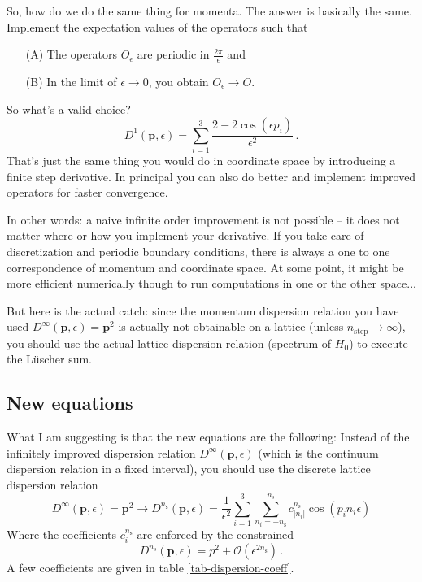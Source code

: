 \documentclass[
    aps,
    prl,
    showkeys,
    nofootinbib,
    floatfix
]{revtex4-1}
\renewcommand{\vec}[1]{\boldsymbol{#1}}
\begin{document}
So, how do we do the same thing for momenta.
The answer is basically the same.
Implement the expectation values of the operators such that
\begin{itemize}
    \item[(A)] The operators $O_\epsilon$ are periodic in $\frac{2\pi}{\epsilon}$ and
    \item[(B)] In the limit of $\epsilon \to 0$, you obtain  $O_\epsilon \to  O$.
\end{itemize}

So what's a valid choice?
\begin{equation}
	D^1( \vec p, \epsilon) = \sum_{i=1}^3 \frac{2 - 2 \cos(\epsilon p_i)}{\epsilon^2} \, .
\end{equation}
That's just the same thing you would do in coordinate space by introducing a finite step derivative.
In principal you can also do better and implement improved operators for faster convergence.

In other words: a naive infinite order improvement is not possible -- it does not matter where or how you implement your derivative.
If you take care of discretization and periodic boundary conditions, there is always a one to one correspondence of momentum and coordinate space.
At some point, it might be more efficient numerically though to run computations in one or the other space...

But here is the actual catch: since the momentum dispersion relation you have used $D^\infty(\vec p, \epsilon) = \vec p^2$ is actually not obtainable on a lattice (unless $n_{\mathrm{step}} \to \infty$), you should use the actual lattice dispersion relation (spectrum of $H_0$) to execute the Lüscher sum.

\subsection{New equations}

What I am suggesting is that the new equations are the following:
Instead of the infinitely improved dispersion relation $D^\infty(\vec p, \epsilon)$ (which is the continuum dispersion relation in a fixed interval), you should use the discrete lattice dispersion relation
\begin{equation}
    D^\infty(\vec p, \epsilon) = \vec p ^2 
    \to 
    D^{n_{\mathrm{s}}}(\vec p, \epsilon) 
    =
    \frac{1}{\epsilon^2} \sum\limits_{i=1}^3 \sum\limits_{n_i=-n_{\mathrm{s}}}^{n_{\mathrm{s}}} c_{|n_i|}^{n_{\mathrm{s}}} \cos( p_i n_i \epsilon)
\end{equation}
Where the coefficients $c_i^{n_{\mathrm{s}}}$ are enforced by the constrained
\begin{equation}\label{def:lattice-dispersion}
    D^{n_{\mathrm{s}}}(\vec p, \epsilon)
    =
    p^2 + \mathcal O \left(\epsilon^{2 n_{\mathrm{s}}}\right)
    \, .
\end{equation}
A few coefficients are given in table \ref{tab-dispersion-coeff}.
\end{document}
